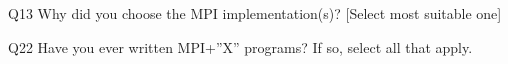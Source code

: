 \begin{description}%
\item{Q13} Why did you choose the MPI implementation(s)? [Select most suitable one]%
\item{Q22} Have you ever written MPI+”X” programs? If so, select all that apply.%
\end{description}%
